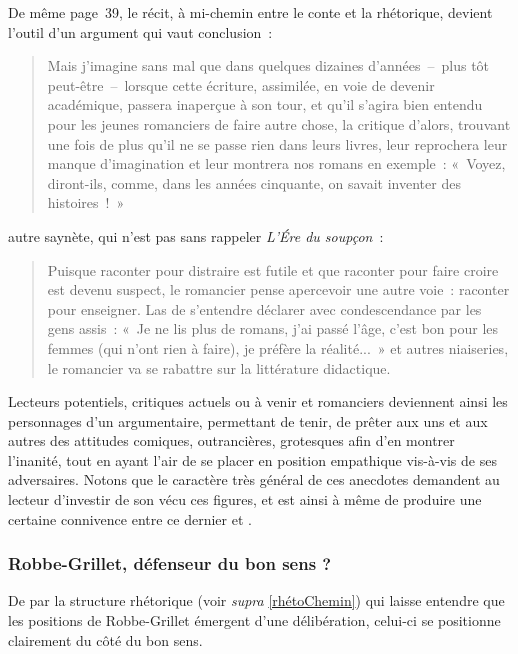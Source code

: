 De même page~39, le récit, à mi-chemin entre le conte et la rhétorique, devient l'outil d'un argument qui vaut conclusion~:
\begin{quote}
Mais j’imagine sans mal que dans quelques dizaines d’années~–~plus tôt peut-être~–~lorsque cette écriture, assimilée, en voie de devenir académique, passera inaperçue à son tour, et qu’il s’agira bien entendu pour les jeunes romanciers de faire autre chose, la critique d’alors, trouvant une fois de plus qu’il ne se passe rien dans leurs livres, leur reprochera leur manque d’imagination et leur montrera nos romans en exemple~: «~Voyez, diront-ils, comme, dans les années cinquante, on savait inventer des histoires~!~»
\end{quote}
autre saynète, qui n'est pas sans rappeler \textit{L'Ére du soupçon}~:
\begin{quote}
Puisque raconter pour distraire est futile et que raconter pour faire croire est devenu suspect, le romancier pense apercevoir une autre voie~: raconter pour enseigner. Las de s’entendre déclarer avec condescendance par les gens assis~: «~Je ne lis plus de romans, j’ai passé l’âge, c’est bon pour les femmes (qui n’ont rien à faire), je préfère la réalité...~» et autres niaiseries,  le romancier va se rabattre sur la littérature didactique.   
\end{quote}
Lecteurs potentiels, critiques actuels ou à venir et romanciers deviennent ainsi les personnages d'un argumentaire, permettant de tenir, de prêter aux uns et aux autres des attitudes comiques, outrancières, grotesques afin d'en montrer l'inanité, tout en ayant l'air de se placer en position empathique vis-à-vis de ses adversaires. Notons que le caractère très général de ces anecdotes demandent au lecteur d'investir de son vécu ces figures, et est ainsi à même de produire une certaine connivence entre ce dernier et \robbe. 


\subsubsection{Robbe-Grillet, défenseur du bon sens ?}
\label{bonsens}

De par la structure rhétorique (voir \textit{supra} \ref{rhétoChemin}) qui laisse entendre que les positions de Robbe-Grillet émergent d'une délibération, celui-ci se positionne clairement du côté du bon sens. 

